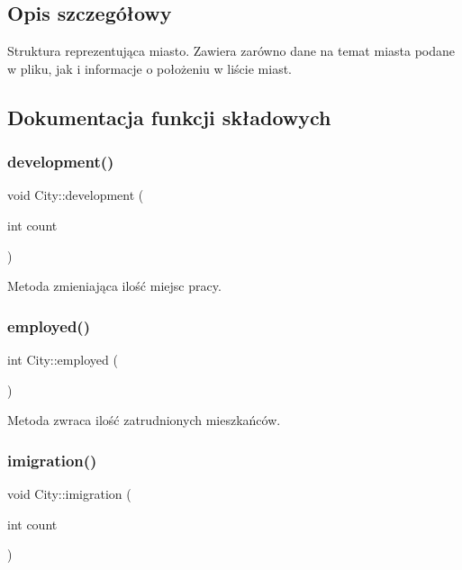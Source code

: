 \subsection{Opis szczegółowy}
Struktura reprezentująca miasto. Zawiera zarówno dane na temat miasta podane w pliku, jak i informacje o położeniu w liście miast. 

\subsection{Dokumentacja funkcji składowych}
\mbox{\label{struct_city_a939d6b83111469e8718bae03174db553}} 
\subsubsection{\texorpdfstring{development()}{development()}}
{\footnotesize\ttfamily void City\+::development (\begin{DoxyParamCaption}\item[{int}]{count }\end{DoxyParamCaption})}



Metoda zmieniająca ilość miejsc pracy. 

\mbox{\label{struct_city_af88917f06685c5c0230af013234bf3b5}} 
\subsubsection{\texorpdfstring{employed()}{employed()}}
{\footnotesize\ttfamily int City\+::employed (\begin{DoxyParamCaption}{ }\end{DoxyParamCaption})}



Metoda zwraca ilość zatrudnionych mieszkańców. 

\mbox{\label{struct_city_a23e3ed6e989bf65632be337b7cc9ff54}} 
\subsubsection{\texorpdfstring{imigration()}{imigration()}}
{\footnotesize\ttfamily void City\+::imigration (\begin{DoxyParamCaption}\item[{int}]{count }\end{DoxyParamCaption})}



